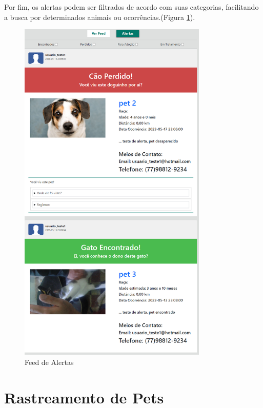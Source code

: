 Por fim, os alertas podem ser filtrados de acordo com suas categorias, facilitando a busca por determinados animais ou ocorrências.(Figura \ref{fig:FeedDeAlertas}).
\newpage

\begin{figure}[htb]
     \centering
     \includegraphics[width=9cm]{arquivos/Figuras/image19.png}
     \caption{Feed de Alertas}
         \label{fig:FeedDeAlertas}
\end{figure}

\newpage

\section{Rastreamento de Pets}

